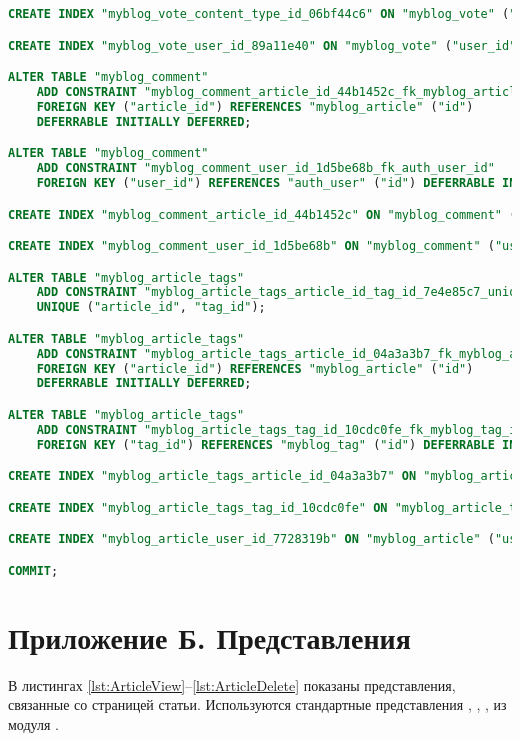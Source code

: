 \begin{lstlisting}[caption={Сгенерированная структура базы данных}, label={lst:sqlmigrate}, language=SQL]
CREATE INDEX "myblog_vote_content_type_id_06bf44c6" ON "myblog_vote" ("content_type_id");

CREATE INDEX "myblog_vote_user_id_89a11e40" ON "myblog_vote" ("user_id");

ALTER TABLE "myblog_comment"
	ADD CONSTRAINT "myblog_comment_article_id_44b1452c_fk_myblog_article_id"
	FOREIGN KEY ("article_id") REFERENCES "myblog_article" ("id")
	DEFERRABLE INITIALLY DEFERRED;

ALTER TABLE "myblog_comment"
	ADD CONSTRAINT "myblog_comment_user_id_1d5be68b_fk_auth_user_id"
	FOREIGN KEY ("user_id") REFERENCES "auth_user" ("id") DEFERRABLE INITIALLY DEFERRED;

CREATE INDEX "myblog_comment_article_id_44b1452c" ON "myblog_comment" ("article_id");

CREATE INDEX "myblog_comment_user_id_1d5be68b" ON "myblog_comment" ("user_id");

ALTER TABLE "myblog_article_tags"
	ADD CONSTRAINT "myblog_article_tags_article_id_tag_id_7e4e85c7_uniq"
	UNIQUE ("article_id", "tag_id");

ALTER TABLE "myblog_article_tags"
	ADD CONSTRAINT "myblog_article_tags_article_id_04a3a3b7_fk_myblog_article_id"
	FOREIGN KEY ("article_id") REFERENCES "myblog_article" ("id")
	DEFERRABLE INITIALLY DEFERRED;

ALTER TABLE "myblog_article_tags"
	ADD CONSTRAINT "myblog_article_tags_tag_id_10cdc0fe_fk_myblog_tag_id"
	FOREIGN KEY ("tag_id") REFERENCES "myblog_tag" ("id") DEFERRABLE INITIALLY DEFERRED;

CREATE INDEX "myblog_article_tags_article_id_04a3a3b7" ON "myblog_article_tags" ("article_id");

CREATE INDEX "myblog_article_tags_tag_id_10cdc0fe" ON "myblog_article_tags" ("tag_id");

CREATE INDEX "myblog_article_user_id_7728319b" ON "myblog_article" ("user_id");

COMMIT;
\end{lstlisting}

\chapter*{Приложение Б. Представления}
\label{chp:attachment-b}

В листингах \ref{lst:ArticleView}–\ref{lst:ArticleDelete} показаны представления, связанные со страницей статьи.
Используются стандартные представления , , ,  из модуля .

